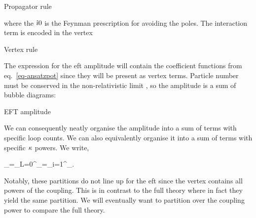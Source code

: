 \documentclass[
  11pt,
  a4paper,
  DIV=11,
  numbers=noendperiod,
  twoside]{scrreprt}
\let\[\relax \let\]\relax %
\DeclareRobustCommand{\[}{\begin{equation}}
\DeclareRobustCommand{\]}{\end{equation}}
\begin{document}
\hypertarget{fig-propagator}{}
{
\makeatletter
\def\LT@makecaption#1#2#3{%
  \noalign{\smash{\hbox{\kern\textwidth\rlap{\kern\marginparsep
  \parbox[t]{\marginparwidth}{%
    \footnotesize{%
      \vspace{(1.1\baselineskip)}
    #1{#2: }\ignorespaces #3}}}}}}%
    }
\makeatother



\label{fig-propagator}Propagator rule

}

where the \(\mathring{\imath} 0\) is the Feynman prescription for avoiding the poles.
The interaction term is encoded in the vertex

\hypertarget{fig-vertex}{}
{
\makeatletter
\def\LT@makecaption#1#2#3{%
  \noalign{\smash{\hbox{\kern\textwidth\rlap{\kern\marginparsep
  \parbox[t]{\marginparwidth}{%
    \footnotesize{%
      \vspace{(1.1\baselineskip)}
    #1{#2: }\ignorespaces #3}}}}}}%
    }
\makeatother



\label{fig-vertex}Vertex rule

}

The expression for the \gls{eft} amplitude will contain the coefficient
functions from eq.~\ref{eq-ansatzpot} since they will be present as
vertex terms. Particle number must be conserved in the non-relativistic
limit , so the
amplitude is a sum of bubble diagrams:

\hypertarget{fig-eftampl}{}
{
\makeatletter
\def\LT@makecaption#1#2#3{%
  \noalign{\smash{\hbox{\kern\textwidth\rlap{\kern\marginparsep
  \parbox[t]{\marginparwidth}{%
    \footnotesize{%
      \vspace{(1.1\baselineskip)}
    #1{#2: }\ignorespaces #3}}}}}}%
    }
\makeatother



\label{fig-eftampl}EFT amplitude

}

We can consequently neatly organise the amplitude into a sum of terms
with specific loop counts. We can also equivalently organise it into a
sum of terms with specific \(\kappa\) powers. We write,

\[\ampl_=\sum\limits_{L=0}^\infty{}_=\sum\limits_{i=1}^\infty \ampl[(i)]_.\]

Notably, these partitions do not line up for the \gls{eft} since the
vertex contains all powers of the coupling. This is in contrast to the
full theory where in fact they yield the same partition. We will
eventually want to partition over the coupling power to compare the full
theory.
\end{document}
